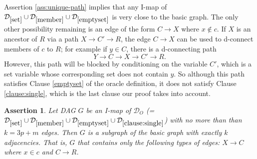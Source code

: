 \documentclass{elsarticle}%
\newtheorem{assertion}[theorem]{Assertion}
\newcommand{\R}{R}
\newcommand{\X}{X}
\newcommand{\Y}{Y}
\newcommand{\C}{C}
\newcommand{\G}{G}
\newcommand{\D}{\mathcal{D}}
\renewcommand{\c}{c}
\newcommand{\x}{x}
\newcommand{\y}{y}
\begin{document}
Assertion \ref{ass:unique-path} implies that any I-map of $\D_{\ref{set}}\cup \D_{\ref{member}}\cup
\D_{\ref{emptyset}}$ is very close to the basic graph. The only other possibility remaining is an edge of the form $\C \rightarrow \X$ where $\x \not\in \c$. If $\X$ is an ancestor of $\R$ via a path $\X \rightarrow \C' \rightarrow \R$, the edge $\C \rightarrow \X$ can be used to d-connect members of $\c$ to $\R$; for example if $\y \in \C$, there is a d-connecting path $$\Y \rightarrow \C \rightarrow \X \rightarrow \C' \rightarrow \R.$$ However, this path will be blocked by conditioning on the variable $\C'$, which is a set variable whose corresponding set does not contain $y$. So although this path satisfies Clause \ref{emptyset} of the oracle definition, it does not satisfy Clause \ref{clause:single}, which is the last clause our proof takes into account.

\begin{assertion} \label{ass:final}
Let DAG $\G$ be an I-map of $\D_{O}$ (= $\D_{\ref{set}}\cup \D_{\ref{member}}\cup
\D_{\ref{emptyset}} \cup \D_{\ref{clause:single}}$)
with no more than than $k = 3p +m$ edges. Then $\G$ is a subgraph of the basic graph with exactly $k$ adjacencies. That is, $\G$ that contains only the following types of edges: $\X \rightarrow \C$ where $\x \in \c$ and $\C \rightarrow \R$. 
\end{assertion}
  
\end{document}
